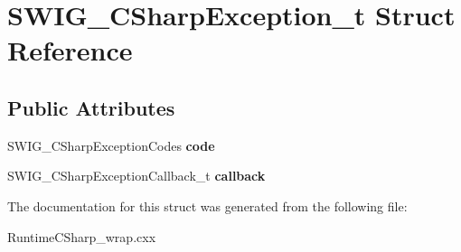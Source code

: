 \hypertarget{struct_s_w_i_g___c_sharp_exception__t}{}\section{S\+W\+I\+G\+\_\+\+C\+Sharp\+Exception\+\_\+t Struct Reference}
\label{struct_s_w_i_g___c_sharp_exception__t}
\subsection*{Public Attributes}
\begin{DoxyCompactItemize}
\item 
\hypertarget{struct_s_w_i_g___c_sharp_exception__t_aafa02b02869cd0423dcee68c867b4e53}{}\label{struct_s_w_i_g___c_sharp_exception__t_aafa02b02869cd0423dcee68c867b4e53} 
S\+W\+I\+G\+\_\+\+C\+Sharp\+Exception\+Codes {\bfseries code}
\item 
\hypertarget{struct_s_w_i_g___c_sharp_exception__t_a6dccb706a135c7f0e48102b3b528f2bc}{}\label{struct_s_w_i_g___c_sharp_exception__t_a6dccb706a135c7f0e48102b3b528f2bc} 
S\+W\+I\+G\+\_\+\+C\+Sharp\+Exception\+Callback\+\_\+t {\bfseries callback}
\end{DoxyCompactItemize}


The documentation for this struct was generated from the following file\+:\begin{DoxyCompactItemize}
\item 
Runtime\+C\+Sharp\+\_\+wrap.\+cxx\end{DoxyCompactItemize}

